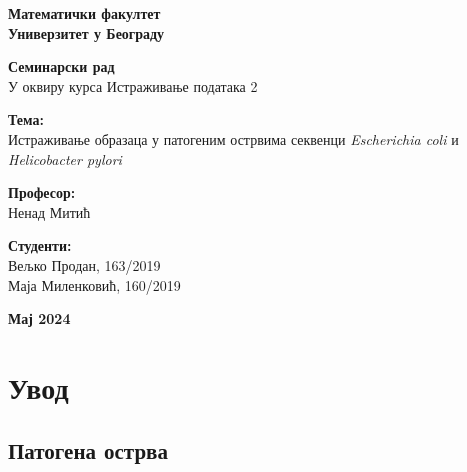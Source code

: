 \documentclass[12pt]{article}
\begin{document}
 


\begin{center}
    \large\textbf{Математички факултет} \\
    \large\textbf{Универзитет у Београду}
    
    \vspace{3cm}
    
    \Large\textbf{Семинарски рад} \\
    \large У оквиру курса Истраживање података 2
    
    \vspace{3cm}
    
    \LARGE\textbf{Тема:} \\
    \Large Истраживање образаца у патогеним острвима секвенци \textit{Escherichia coli} и \textit{Helicobacter pylori}
    
    \vspace{4cm}
    
    \begin{minipage}{0.4\textwidth}
        \begin{flushleft}
            \large\textbf{Професор:} \\
            \large Ненад Митић
        \end{flushleft}
    \end{minipage}
    \begin{minipage}{0.4\textwidth}
        \begin{flushright}
            \large\textbf{Студенти:} \\
            \large Вељко Продан, 163/2019 \\
            \large Маја Миленковић, 160/2019
        \end{flushright}
    \end{minipage}

    \vfill
    
    \large\textbf{Мај 2024}
    
\end{center}

\newpage

\tableofcontents

\newpage

\section{Увод}

\subsection{Патогена острва}
\end{document}
